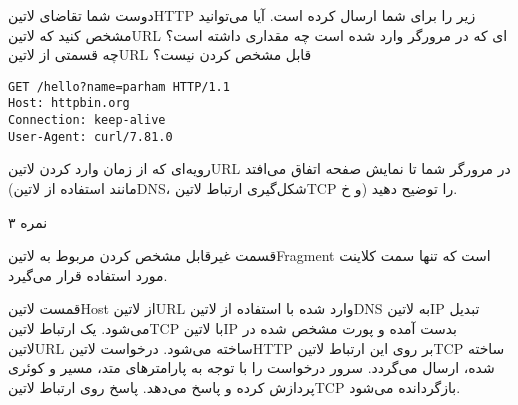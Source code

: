 \documentclass[../main.tex]{subfiles}
\begin{document}

دوست شما تقاضای ‌لاتین{HTTP} زیر را برای شما ارسال کرده است.
آیا می‌توانید مشخص کنید که ‌لاتین{URL} ای که در مرورگر وارد شده است چه مقداری داشته است؟
چه قسمتی از ‌لاتین{URL} قابل مشخص کردن نیست؟

\begin{latin}
\begin{verbatim}
GET /hello?name=parham HTTP/1.1
Host: httpbin.org
Connection: keep-alive
User-Agent: curl/7.81.0
\end{verbatim}
\end{latin}

رویه‌ای که از زمان وارد کردن ‌لاتین{URL} در مرورگر شما تا نمایش صفحه اتفاق می‌افتد (مانند استفاده از ‌لاتین{DNS}، شکل‌گیری ارتباط ‌لاتین{TCP} و ‌خ) را توضیح دهید.

۳ نمره

\begin{answer}

قسمت غیرقابل مشخص کردن مربوط به ‌لاتین{Fragment} است که تنها سمت کلاینت مورد استفاده قرار می‌گیرد.

 قمست ‌لاتین{Host} از ‌لاتین{URL} وارد شده با استفاده از ‌لاتین{DNS} به ‌لاتین{IP} تبدیل می‌شود.
 یک ارتباط ‌لاتین{TCP} با ‌لاتین{IP} بدست آمده و پورت مشخص شده در ‌لاتین{URL} ساخته می‌شود.
 درخواست ‌لاتین{HTTP} بر روی این ارتباط ‌لاتین{TCP} ساخته شده، ارسال می‌گردد.
 سرور درخواست را با توجه به پارامترهای متد، مسیر و کوئری پردازش کرده و پاسخ می‌دهد.
 پاسخ روی ارتباط ‌لاتین{TCP} بازگردانده می‌شود.

\end{answer}
\end{document}
